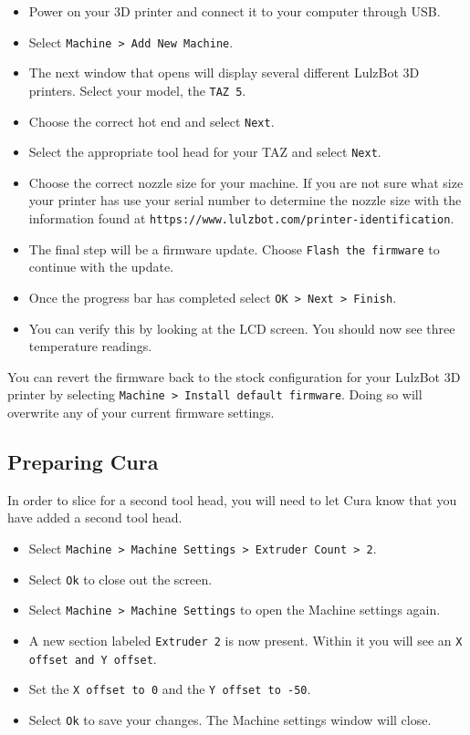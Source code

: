 \begin{itemize}
\item Power on your 3D printer and connect it to your computer through USB.
\item Select \texttt{Machine > Add New Machine}.
\item The next window that opens will display several different LulzBot 3D printers. Select your model, the \texttt{TAZ 5}.
\item Choose the correct hot end and select \texttt{Next}.
\item Select the appropriate tool head for your TAZ and select \texttt{Next}.
\item Choose the correct nozzle size for your machine. If you are not sure what size your printer has use your serial number to determine the nozzle size with the information found at \texttt{https://www.lulzbot.com/printer-identification}.
\item The final step will be a firmware update. Choose \texttt{Flash the firmware} to continue with the update.
\item Once the progress bar has completed select \texttt{OK > Next > Finish}.  
\item You can verify this by looking at the LCD screen. You should now see three temperature readings. 
\end{itemize} 
You can revert the firmware back to the stock configuration for your LulzBot\textsuperscript{\miniscule{\texttrademark}} 3D printer by selecting \texttt{Machine > Install default firmware}. Doing so will overwrite any of your current firmware settings.

\subsection{Preparing Cura}
In order to slice for a second tool head, you will need to let Cura know that you have added a second tool head. 
\begin{itemize} 
\item Select \texttt{Machine > Machine Settings > Extruder Count > 2}.
\item Select \texttt{Ok} to close out the screen.
\item Select \texttt{Machine > Machine Settings} to open the Machine settings again. 
\item A new section labeled \texttt{Extruder 2} is now present. Within it you will see an \texttt{X offset and Y offset}.
\item Set the \texttt{X offset to 0} and the \texttt{Y offset to -50}.
\item Select \texttt{Ok} to save your changes. The Machine settings window will close.
\end{itemize} 


